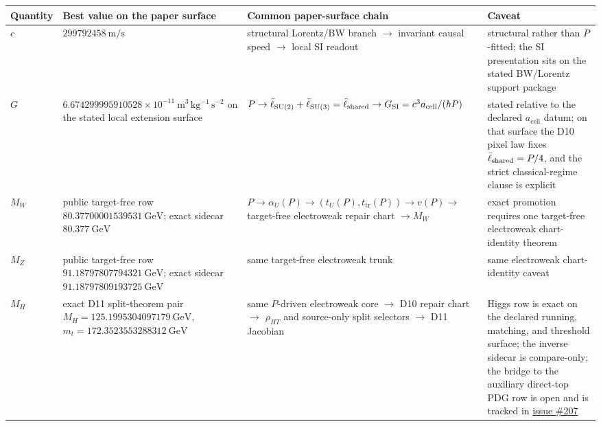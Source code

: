 {\centering
\scriptsize
\setlength{\tabcolsep}{3pt}
\begin{tabular}{@{}>{\raggedright\arraybackslash}p{}>{\raggedright\arraybackslash}p{}>{\raggedright\arraybackslash}p{}>{\raggedright\arraybackslash}p{}@{}}
\toprule
Quantity & Best value on the paper surface & Common paper-surface chain & Caveat \\
\midrule
\(c\) & \(299792458~\mathrm{m/s}\) & structural Lorentz/BW branch \(\rightarrow\) invariant causal speed \(\rightarrow\) local SI readout & structural rather than \(P\)-fitted; the SI presentation sits on the stated BW/Lorentz support package \\
\(G\) & \(6.674299995910528\times10^{-11}~\mathrm{m^3\,kg^{-1}\,s^{-2}}\) on the stated local extension surface & \(P \rightarrow \bar{\ell}_{\mathrm{SU(2)}}+\bar{\ell}_{\mathrm{SU(3)}} = \bar{\ell}_{\mathrm{shared}} \rightarrow G_{\mathrm{SI}} = c^3 a_{\mathrm{cell}}/(\hbar P)\) & stated relative to the declared \(a_{\mathrm{cell}}\) datum; on that surface the D10 pixel law fixes \(\bar{\ell}_{\mathrm{shared}}=P/4\), and the strict classical-regime clause is explicit \\
\(M_W\) & public target-free row \(80.37700001539531~\mathrm{GeV}\); exact sidecar \(80.377~\mathrm{GeV}\) & \(P \rightarrow \alpha_U(P) \rightarrow (t_U(P),t_{\mathrm{tr}}(P)) \rightarrow v(P) \rightarrow\) target-free electroweak repair chart \(\rightarrow M_W\) & exact promotion requires one target-free electroweak chart-identity theorem \\
\(M_Z\) & public target-free row \(91.18797807794321~\mathrm{GeV}\); exact sidecar \(91.18797809193725~\mathrm{GeV}\) & same target-free electroweak trunk & same electroweak chart-identity caveat \\
\(M_H\) & exact D11 split-theorem pair \(M_H=125.1995304097179~\mathrm{GeV}\), \(m_t=172.3523553288312~\mathrm{GeV}\) & same \(P\)-driven electroweak core \(\rightarrow\) D10 repair chart \(\rightarrow\) \(\rho_{HT}\) and source-only split selectors \(\rightarrow\) D11 Jacobian & Higgs row is exact on the declared running, matching, and threshold surface; the inverse sidecar is compare-only; the bridge to the auxiliary direct-top PDG row is open and is tracked in \href{https://github.com/FloatingPragma/observer-patch-holography/issues/207}{issue \#207} \\
\bottomrule
\end{tabular}
\par}

